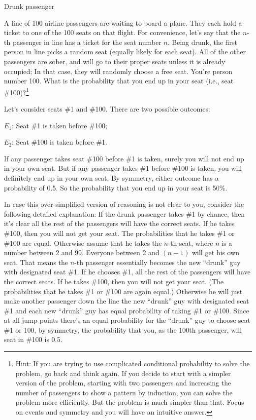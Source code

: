 \begin{problem}{Drunk passenger}

A line of 100 airline passengers are waiting to board a plane. They each hold a ticket to one
of the 100 seats on that flight. For convenience, let's say that the $n$-th passenger in line
has a ticket for the seat number $n$. Being drunk, the first person in line picks a random seat
(equally likely for each seat). All of the other passengers are sober, and will go to their
proper seats unless it is already occupied; In that case, they will randomly choose a free seat.
You're person number 100. What is the probability that you end up in your seat (i.e., seat
\#100)?\footnote[3]{Hint: If you are trying to use complicated conditional probability to solve
the problem, go back and think again. If you decide to start with a simpler version of the
problem, starting with two passengers and increasing the number of passengers to show a
pattern by induction, you can solve the problem more efficiently. But the problem is much
simpler than that. Focus on events and symmetry and you will have an intuitive answer.}
\end{problem}

\begin{solution}
Let's consider seats \#1 and \#100. There are two possible outcomes:

\noindent $E_1$: Seat \#1 is taken before \#100;

\noindent $E_2$: Seat \#100 is taken before \#1.

If any passenger takes seat \#100 before \#1 is taken, surely you will not end up in your
own seat. But if any passenger takes \#1 before \#100 is taken, you will definitely end up in
your own seat. By symmetry, either outcome has a probability of 0.5. So the probability that
you end up in your seat is 50\%.

In case this over-simplified version of reasoning is not clear to you, consider the following
detailed explanation: If the drunk passenger takes \#1 by chance, then it's clear all the rest of
the passengers will have the correct seats. If he takes \#100, then you will not get your seat.
The probabilities that he takes \#1 or \#100 are equal. Otherwise assume that he takes the
$n$-th seat, where $n$ is a number between 2 and 99. Everyone between 2 and $(n-1)$ will
get his own seat. That means the $n$-th passenger essentially becomes the new ``drunk'' guy
with designated seat \#1. If he chooses \#1, all the rest of the passengers will have the
correct seats. If he takes \#100, then you will not get your seat. (The probabilities that he
takes \#1 or \#100 are again equal.) Otherwise he will just make another passenger down the
line the new ``drunk'' guy with designated seat \#1 and each new ``drunk'' guy has equal
probability of taking \#1 or \#100. Since at all jump points there's an equal probability for
the ``drunk'' guy to choose seat \#1 or 100, by symmetry, the probability that you, as the
100th passenger, will seat in \#100 is 0.5.
\end{solution}


